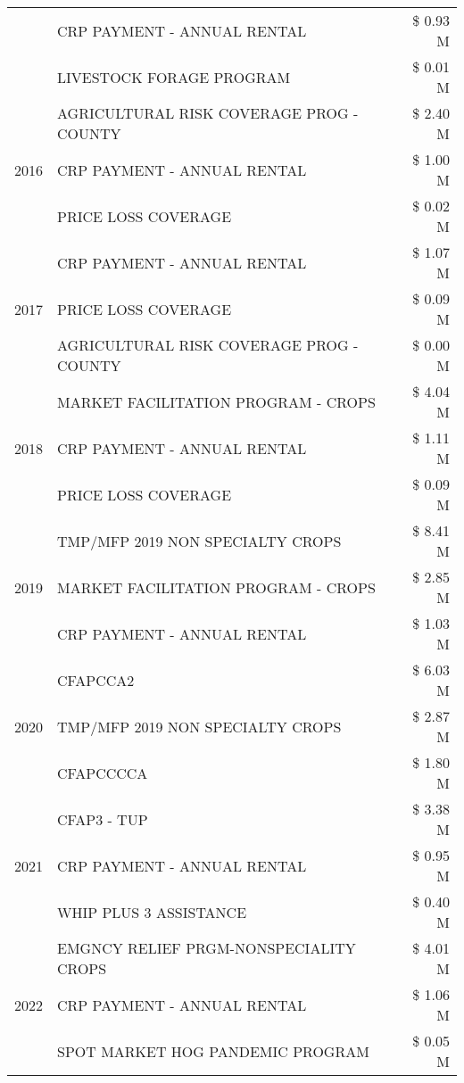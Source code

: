 \begin{tabular}{llr}
 & CRP PAYMENT - ANNUAL RENTAL & \$ 0.93 M \\
 & LIVESTOCK FORAGE PROGRAM & \$ 0.01 M \\
\cline{1-3}
\multirow[t]{3}{*}{2016} & AGRICULTURAL RISK COVERAGE PROG - COUNTY & \$ 2.40 M \\
 & CRP PAYMENT - ANNUAL RENTAL & \$ 1.00 M \\
 & PRICE LOSS COVERAGE & \$ 0.02 M \\
\cline{1-3}
\multirow[t]{3}{*}{2017} & CRP PAYMENT - ANNUAL RENTAL & \$ 1.07 M \\
 & PRICE LOSS COVERAGE & \$ 0.09 M \\
 & AGRICULTURAL RISK COVERAGE PROG - COUNTY & \$ 0.00 M \\
\cline{1-3}
\multirow[t]{3}{*}{2018} & MARKET FACILITATION PROGRAM - CROPS & \$ 4.04 M \\
 & CRP PAYMENT - ANNUAL RENTAL & \$ 1.11 M \\
 & PRICE LOSS COVERAGE & \$ 0.09 M \\
\cline{1-3}
\multirow[t]{3}{*}{2019} & TMP/MFP 2019 NON SPECIALTY CROPS & \$ 8.41 M \\
 & MARKET FACILITATION PROGRAM - CROPS & \$ 2.85 M \\
 & CRP PAYMENT - ANNUAL RENTAL & \$ 1.03 M \\
\cline{1-3}
\multirow[t]{3}{*}{2020} & CFAPCCA2 & \$ 6.03 M \\
 & TMP/MFP 2019 NON SPECIALTY CROPS & \$ 2.87 M \\
 & CFAPCCCCA & \$ 1.80 M \\
\cline{1-3}
\multirow[t]{3}{*}{2021} & CFAP3 - TUP & \$ 3.38 M \\
 & CRP PAYMENT - ANNUAL RENTAL & \$ 0.95 M \\
 & WHIP PLUS 3 ASSISTANCE & \$ 0.40 M \\
\cline{1-3}
\multirow[t]{3}{*}{2022} & EMGNCY RELIEF PRGM-NONSPECIALITY CROPS & \$ 4.01 M \\
 & CRP PAYMENT - ANNUAL RENTAL & \$ 1.06 M \\
 & SPOT MARKET HOG PANDEMIC PROGRAM & \$ 0.05 M \\
\cline{1-3}
\bottomrule
\end{tabular}
